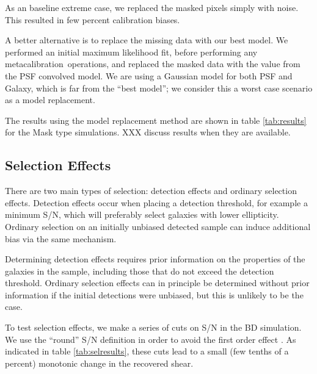 \documentclass[usegraphicx,usenatbib]{mn2e}
\newcommand{\mcal}{metacalibration}
\begin{document}
As an baseline extreme case, we replaced the masked pixels simply with noise.
This resulted in few percent calibration biases.

A better alternative is to replace the missing data with our best model.  We
performed an initial maximum likelihood fit, before performing any \mcal\
operations, and replaced the masked data with the value from the PSF convolved
model.  We are using a Gaussian model for both PSF and Galaxy, which is far
from the ``best model''; we consider this a worst case scenario as a model
replacement. 

The results using the model replacement method are shown in table
\ref{tab:results} for the Mask type simulations.  XXX discuss results when they
are available.


\subsection{Selection Effects} \label{sec:selection}

There are two main types of selection: detection effects and ordinary selection
effects.  Detection effects occur when placing a detection threshold, for
example a minimum S/N, which will preferably select galaxies with lower
ellipticity.  Ordinary selection on an initially unbiased detected sample can
induce additional bias via the same mechanism.

Determining detection effects requires prior information on the properties of
the galaxies in the sample, including those that do not exceed the detection
threshold.  Ordinary selection effects can in principle be determined without
prior information if the initial detections were unbiased, but this is unlikely
to be the case.

To test selection effects, we make a series of cuts on S/N in the BD
simulation.  We use the ``round'' S/N definition in order to avoid the first
order effect \citep{DESSVShear}. As indicated in table \ref{tab:selresults},
these cuts lead to a small (few tenths of a percent) monotonic change in the
recovered shear.
\end{document}
